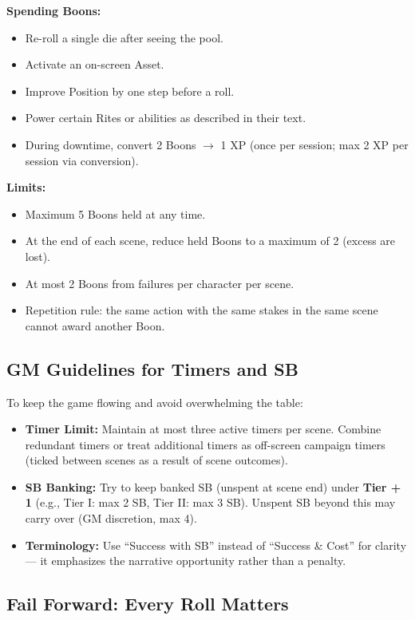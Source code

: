 \textbf{Spending Boons:}
\begin{itemize}
  \item Re-roll a single die after seeing the pool.
  \item Activate an on-screen Asset.
  \item Improve Position by one step before a roll.
  \item Power certain Rites or abilities as described in their text.
  \item During downtime, convert 2 Boons $\rightarrow$ 1 XP (once per session; max 2 XP per session via conversion).
\end{itemize}

\textbf{Limits:}
\begin{itemize}
  \item Maximum 5 Boons held at any time.
  \item At the end of each scene, reduce held Boons to a maximum of 2 (excess are lost).
  \item At most 2 Boons from failures per character per scene.
  \item Repetition rule: the same action with the same stakes in the same scene cannot award another Boon.
\end{itemize}

\subsection{GM Guidelines for Timers and SB}
To keep the game flowing and avoid overwhelming the table:
\begin{itemize}
  \item \textbf{Timer Limit:} Maintain at most three active timers per scene. Combine redundant timers or treat additional timers as off-screen campaign timers (ticked between scenes as a result of scene outcomes).
  \item \textbf{SB Banking:} Try to keep banked SB (unspent at scene end) under \textbf{Tier + 1} (e.g., Tier I: max 2 SB, Tier II: max 3 SB). Unspent SB beyond this may carry over (GM discretion, max 4).
  \item \textbf{Terminology:} Use ``Success with SB'' instead of ``Success \& Cost'' for clarity --- it emphasizes the narrative opportunity rather than a penalty.
\end{itemize}

\subsection{Fail Forward: Every Roll Matters}

